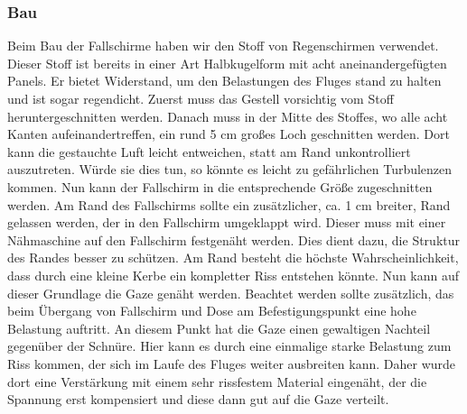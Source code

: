 \subsubsection{Bau}
Beim Bau der Fallschirme haben wir den Stoff von Regenschirmen verwendet. Dieser Stoff ist bereits in einer Art Halbkugelform mit acht aneinandergefügten Panels. Er bietet Widerstand, um den Belastungen des Fluges stand zu halten und ist sogar regendicht. Zuerst muss das Gestell vorsichtig vom Stoff heruntergeschnitten werden. Danach muss in der Mitte des Stoffes, wo alle acht Kanten aufeinandertreffen, ein rund 5 cm großes Loch geschnitten werden. Dort kann die gestauchte Luft leicht entweichen, statt am Rand unkontrolliert auszutreten. Würde sie dies tun, so könnte es leicht zu gefährlichen Turbulenzen kommen. Nun kann der Fallschirm in die entsprechende Größe zugeschnitten werden. Am Rand des Fallschirms sollte ein zusätzlicher, ca. 1 cm breiter, Rand gelassen werden, der in den Fallschirm umgeklappt wird. Dieser muss mit einer Nähmaschine auf den Fallschirm festgenäht werden. Dies dient dazu, die Struktur des Randes besser zu schützen. Am Rand besteht die höchste Wahrscheinlichkeit, dass durch eine kleine Kerbe ein kompletter Riss entstehen könnte. Nun kann auf dieser Grundlage die Gaze genäht werden. Beachtet werden sollte zusätzlich, das beim Übergang von Fallschirm und Dose am Befestigungspunkt eine hohe Belastung auftritt. An diesem Punkt hat die Gaze einen gewaltigen Nachteil gegenüber der Schnüre. Hier kann es durch eine einmalige starke Belastung zum Riss kommen, der sich im Laufe des Fluges weiter ausbreiten kann. Daher wurde dort eine Verstärkung mit einem sehr rissfestem Material eingenäht, der die Spannung erst kompensiert und diese dann gut auf die Gaze verteilt.